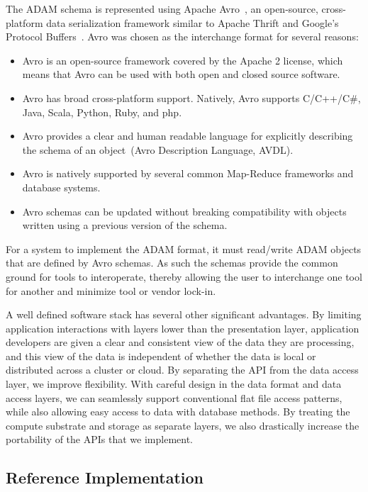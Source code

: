 \documentclass{bioinfo}
\begin{document}
The ADAM schema is represented using Apache Avro~\citep{avro}, an open-source, cross-platform data serialization framework similar
to Apache Thrift and Google's Protocol Buffers~\citep{thrift, protobuf}. Avro was chosen as the interchange format for several reasons:

\begin{itemize}
\item Avro is an open-source framework covered by the Apache 2 license, which means that Avro can be used with both open and closed source software.
\item Avro has broad cross-platform support. Natively, Avro supports C/C++/C\#, Java, Scala, Python, Ruby, and php.
\item Avro provides a clear and human readable language for explicitly describing the schema of an object~(Avro Description Language, AVDL).
\item Avro is natively supported by several common Map-Reduce frameworks and database systems.
\item Avro schemas can be updated without breaking compatibility with objects written using a previous version of the schema.
\end{itemize}

For a system to implement the ADAM format, it must read/write ADAM objects that are defined by Avro schemas. As such the schemas
provide the common ground for tools to interoperate, thereby allowing the user to interchange one tool for another and minimize
tool or vendor lock-in.

A well defined software stack has several other significant advantages. By limiting application interactions with layers lower than the presentation layer,
application developers are given a clear and consistent view of the data they are processing, and this view of the data is independent of whether the data
is local or distributed across a cluster or cloud. By separating the API from the data access layer, we improve flexibility. With careful design in the data
format and data access layers, we can seamlessly support conventional flat file access patterns, while also allowing easy access to data with database methods.
By treating the compute substrate and storage as separate layers, we also drastically increase the portability of the APIs that we implement.

\subsection{Reference Implementation}
\label{sec:reference-implementation}
\end{document}
